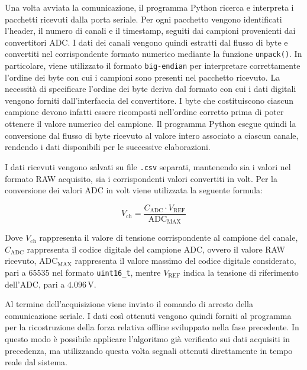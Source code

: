 \documentclass[10pt, a4paper]{article}
\begin{document}
                Una volta avviata la comunicazione, il programma Python ricerca e interpreta i pacchetti ricevuti dalla porta seriale. Per ogni pacchetto 
                vengono identificati l'header, 
                il numero di canali e il timestamp, seguiti dai campioni provenienti dai convertitori ADC. I dati dei canali vengono quindi estratti dal flusso
                di byte e convertiti nel corrispondente formato numerico mediante la funzione \texttt{unpack()}. In particolare, viene utilizzato il formato 
                \texttt{big-endian} per interpretare correttamente l'ordine dei byte con cui i campioni sono presenti nel pacchetto ricevuto.
                La necessità di specificare l'ordine dei byte deriva dal formato con cui i dati digitali vengono forniti dall'interfaccia del convertitore. 
                I byte che costituiscono ciascun campione devono infatti essere ricomposti nell'ordine corretto prima di poter ottenere il valore numerico 
                del campione. Il programma Python esegue quindi la conversione dal flusso di byte ricevuto al valore intero associato a ciascun canale, rendendo 
                i dati disponibili per le successive elaborazioni.

                I dati ricevuti vengono salvati su file \texttt{.csv} separati, mantenendo sia i valori nel formato RAW acquisito, 
                sia i corrispondenti valori convertiti in volt. 
                Per la conversione dei valori ADC in volt viene utilizzata la seguente formula: 

                    \begin{equation}
                        V_{\mathrm{ch}} = \frac{C_{\mathrm{ADC}} \cdot V_{\mathrm{REF}}}{\mathrm{ADC}_{\mathrm{MAX}}}
                    \end{equation}
                
                Dove $V_{\mathrm{ch}}$ rappresenta il valore di tensione corrispondente al campione del canale, $C_{\mathrm{ADC}}$ rappresenta il codice digitale del campione 
                ADC, ovvero il valore RAW ricevuto, $\mathrm{ADC}_{\mathrm{MAX}}$ rappresenta il valore massimo del codice digitale considerato, pari a 65535 
                nel formato \texttt{uint16\_t}, mentre $V_{\mathrm{REF}}$ indica la tensione di riferimento dell'ADC, pari a $4.096\,\mathrm{V}$.

                Al termine dell'acquisizione viene inviato il comando di arresto della comunicazione seriale. I dati così ottenuti vengono quindi forniti 
                al programma per la ricostruzione della forza relativa offline sviluppato nella fase precedente.
                In questo modo è possibile applicare l'algoritmo già verificato sui dati acquisiti in precedenza, ma utilizzando questa volta 
                segnali ottenuti direttamente in tempo reale dal sistema.
\end{document}
